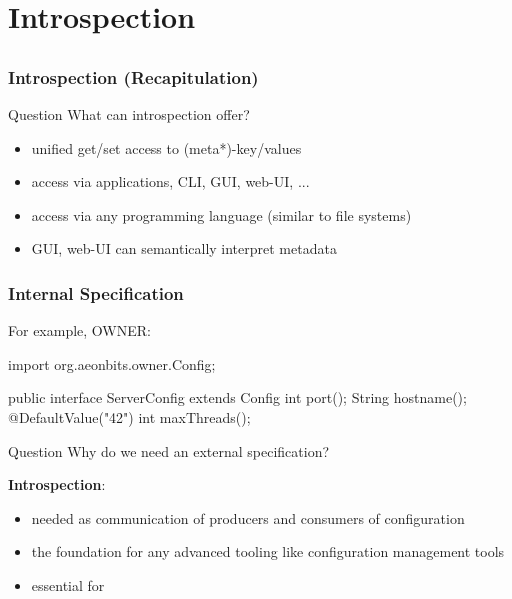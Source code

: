\section{Introspection}

\subsection{}

\begin{frame}
	\frametitle{Introspection (Recapitulation)}
	\begin{alertblock}{Question}
	What can introspection offer?
	\end{alertblock}

	\pause
	\begin{itemize}
	\item unified get/set access to (meta*)-key/values
	\item access via applications, CLI, GUI, web-UI, ...
	\item access via any programming language (similar to file systems)
	\item GUI, web-UI can semantically interpret metadata
	\end{itemize}
\end{frame}

\begin{frame}[fragile]
	\frametitle{Internal Specification}

	For example, OWNER:
	\begin{code}[gobble=4,language=Java]
	import org.aeonbits.owner.Config;

	public interface ServerConfig extends Config {
		int port();
		String hostname();
		@DefaultValue("42")
		int maxThreads();
	}
	\end{code}
\end{frame}

\begin{frame}
	\begin{alertblock}{Question}
	Why do we need an external specification?
	\end{alertblock}

	\pause
	\vspace{1em}

	\textbf{Introspection}:
	\begin{itemize}
	\item needed as communication of producers and consumers of configuration
	\item the foundation for any advanced tooling like configuration management tools
	\item essential for ~\citet{holland2001nofutz}
	\end{itemize}
\end{frame}

